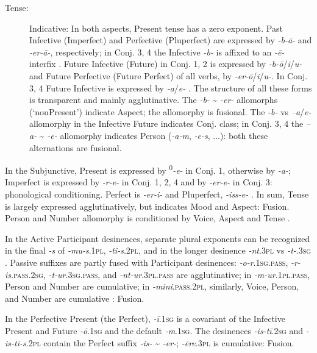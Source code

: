 \documentclass[output=paper, colorlinks,citecolor=brown]{langsci/langscibook}
\begin{document}
\begin{description}
\item[Tense:] Indicative: In both aspects, Present tense has a zero exponent. Past Infective (Imperfect) and Perfective (Pluperfect) are expressed by \textit{-b-ā-} and \textit{-er-ā-}, respectively; in Conj. 3, 4 the Infective \textit{-b-} is affixed to an \textit{-ē-} interfix . Future Infective (Future) in Conj. 1, 2 is expressed by \textit{-b-ō}/\textit{i}/\textit{u-} and Future Perfective (Future Perfect) of all verbs, by \textit{-er-ō}/\textit{i}/\textit{u-}. In Conj. 3, 4 Future Infective is expressed by \textit{-a}/\textit{e-} . The structure of all these forms is transparent and mainly agglutinative. The \textit{-b-} {\textasciitilde} \textit{-er-} allomorphs (`nonPresent') indicate Aspect; the allomorphy is fusional. The \textit{-b-} vs \textit{–a}/\textit{e-} allomorphy in the Infective Future indicates Conj. class; in Conj. 3, 4 the \textit{–a-} {\textasciitilde} \textit{-e-} allomorphy indicates Person (\textit{-a-m}, \textit{-e-s}, ...): both these alternations are fusional.
\end{description}

In the Subjunctive, Present is expressed by \textsuperscript{0}{}\textit{-e-} in Conj. 1, otherwise by \textit{-a-}; Imperfect is expressed by \textit{-r-e-} in Conj. 1, 2, 4 and by \textit{-er-e-} in Conj. 3: phonological conditioning. Perfect is \textit{-er-i-} and Pluperfect, \textit{-iss-e-} .  In sum, Tense is largely expressed agglutinatively, but indicates  Mood and Aspect: Fusion. Person and Number allomorphy is conditioned by Voice, Aspect and Tense . 

In the Active Participant desinences, separate plural exponents can be recognized in the final \textit{-s} of \textit{-mu-s}.\textsc{1pl}, \textit{-ti-s}.\textsc{2pl}, and in the longer desinence \textit{-nt}.\textsc{3pl} vs \textit{-t-}.\textsc{3sg} . Passive suffixes are partly fused with Participant desinences: \textit{-o-r}.\textsc{1sg.pass}, \textit{-r-is}.\textsc{pass.2sg}, \textit{-t-ur}.\textsc{3sg.pass}, and \textit{-nt-ur}.\textsc{3pl.pass} are agglutinative; in \textit{-m-ur}.\textsc{1pl.pass}, Person and Number are cumulative; in \textit{-mini}.\textsc{pass.2pl}, similarly, Voice, Person, and Number are cumulative : Fusion. 

In the Perfective Present (the Perfect), \textit{-ī}.\textsc{1sg} is a covariant of the Infective Present and Future \textit{-ō}.\textsc{1sg} and the default \textit{-m}.\textsc{1sg}. The desinences \textit{-is-tī}.\textsc{2sg} and \textit{-is-ti-s}.\textsc{2pl} contain the Perfect suffix \textit{-is-} {\textasciitilde} \textit{-er-}; \textit{-ēre}.\textsc{3pl} is cumulative: Fusion. 
\end{document}
